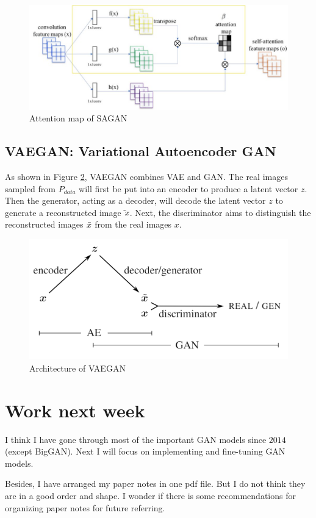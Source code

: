 \documentclass{article} %
\begin{document}
\begin{figure}[h]
	\centering
	\includegraphics[width=0.7\linewidth]{figures/SAGAN_Attentino_map.jpeg}
	\caption{Attention map of SAGAN}
	\label{fig:Attention_map_SAGAN}
\end{figure}

\subsection{VAEGAN: Variational Autoencoder GAN}

As shown in Figure \ref{fig:VAEGAN}, VAEGAN combines VAE and GAN. The real images sampled from $P_{data}$ will first be put into an encoder to produce a latent vector $z$. Then the generator, acting as a decoder, will decode the latent vector $z$ to generate a reconstructed image $\Tilde{}{x}$. Next, the discriminator aims to distinguish the reconstructed images $\Tilde{x}$ from the real images $x$.

\begin{figure}[h]
	\centering
	\includegraphics[width=0.7\linewidth]{figures/VAEGAN.PNG}
	\caption{Architecture of VAEGAN}
	\label{fig:VAEGAN}
\end{figure}

\section{Work next week}

I think I have gone through most of the important GAN models since $2014$ (except BigGAN). Next I will focus on implementing and fine-tuning GAN models. 

Besides, I have arranged my paper notes in one pdf file. But I do not think they are in a good order and shape. I wonder if there is some recommendations for organizing paper notes for future referring.
\end{document}
